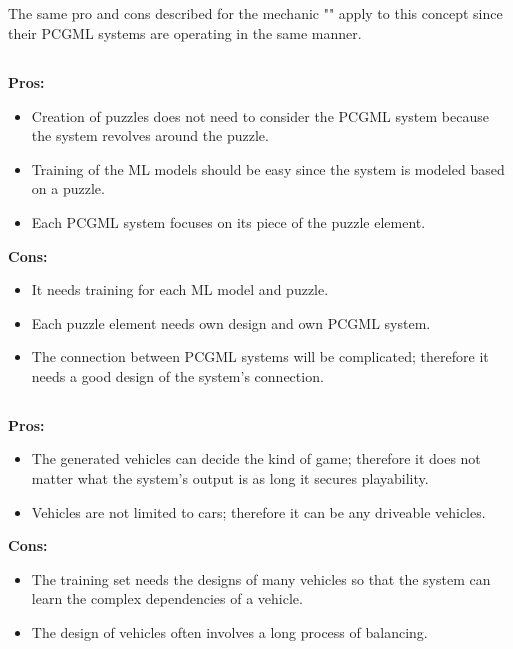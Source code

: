 \documentclass[MGS,Master,english]{twbook}%
\begin{document}
\subsection{}
The same pro and cons described for the mechanic "" apply to this concept since their PCGML systems are operating in the same manner.

\subsection{}
\textbf{Pros:}
\begin{itemize}
	\item Creation of puzzles does not need to consider the PCGML system because the system revolves around the puzzle.
	\item Training of the ML models should be easy since the system is modeled based on a puzzle. 
	\item Each PCGML system focuses on its piece of the puzzle element.
\end{itemize}
\textbf{Cons:}
\begin{itemize}
	\item It needs training for each ML model and puzzle.
	\item Each puzzle element needs own design and own PCGML system.
	\item The connection between PCGML systems will be complicated; therefore it needs a good design of the system’s connection.
\end{itemize}

\subsection{}
\textbf{Pros:}
\begin{itemize}
	\item The generated vehicles can decide the kind of game; therefore it does not matter what the system's output is as long it secures playability.
	\item Vehicles are not limited to cars; therefore it can be any driveable vehicles.
\end{itemize}
\textbf{Cons:}
\begin{itemize}
	\item The training set needs the designs of many vehicles so that the system can learn the complex dependencies of a vehicle.
	\item The design of vehicles often involves a long process of balancing.
\end{itemize}
\end{document}
